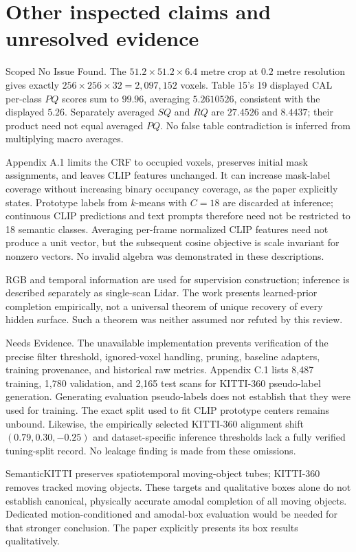 \documentclass[10pt]{article}
\begin{document}
\section*{Other inspected claims and unresolved evidence}
Scoped No Issue Found. The \(51.2\times51.2\times6.4\) metre crop at \(0.2\) metre resolution gives exactly \(256\times256\times32=2{,}097{,}152\) voxels. Table 15’s 19 displayed CAL per-class \(PQ\) scores sum to \(99.96\), averaging \(5.2610526\), consistent with the displayed \(5.26\). Separately averaged \(SQ\) and \(RQ\) are \(27.4526\) and \(8.4437\); their product need not equal averaged \(PQ\). No false table contradiction is inferred from multiplying macro averages.\par
Appendix A.1 limits the CRF to occupied voxels, preserves initial mask assignments, and leaves CLIP features unchanged. It can increase mask-label coverage without increasing binary occupancy coverage, as the paper explicitly states. Prototype labels from \(k\)-means with \(C=18\) are discarded at inference; continuous CLIP predictions and text prompts therefore need not be restricted to 18 semantic classes. Averaging per-frame normalized CLIP features need not produce a unit vector, but the subsequent cosine objective is scale invariant for nonzero vectors. No invalid algebra was demonstrated in these descriptions.\par
RGB and temporal information are used for supervision construction; inference is described separately as single-scan Lidar. The work presents learned-prior completion empirically, not a universal theorem of unique recovery of every hidden surface. Such a theorem was neither assumed nor refuted by this review.\par
Needs Evidence. The unavailable implementation prevents verification of the precise filter threshold, ignored-voxel handling, pruning, baseline adapters, training provenance, and historical raw metrics. Appendix C.1 lists 8,487 training, 1,780 validation, and 2,165 test scans for KITTI-360 pseudo-label generation. Generating evaluation pseudo-labels does not establish that they were used for training. The exact split used to fit CLIP prototype centers remains unbound. Likewise, the empirically selected KITTI-360 alignment shift \((0.79,0.30,-0.25)\) and dataset-specific inference thresholds lack a fully verified tuning-split record. No leakage finding is made from these omissions.\par
SemanticKITTI preserves spatiotemporal moving-object tubes; KITTI-360 removes tracked moving objects. These targets and qualitative boxes alone do not establish canonical, physically accurate amodal completion of all moving objects. Dedicated motion-conditioned and amodal-box evaluation would be needed for that stronger conclusion. The paper explicitly presents its box results qualitatively.\par
\end{document}
